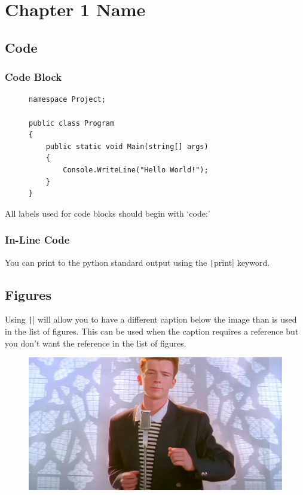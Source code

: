 \chapter{Chapter 1 Name}

\section{Code}

\subsection{Code Block}

\begin{figure}[H]
    \begin{verbatim}
namespace Project;

public class Program
{
    public static void Main(string[] args)
    {
        Console.WriteLine("Hello World!");
    }
}
    \end{verbatim}
\end{figure}

All labels used for code blocks should begin with `code:'

\subsection{In-Line Code}

You can print to the python standard output using the \texttt|print| keyword. 

\newpage
\section{Figures}

Using \texttt|\macLFC| will allow you to have a different caption below the image than is used in the list of figures.
This can be used when the caption requires a reference but you don't want the reference in the list of figures.

\begin{figure}[H]
    \centering
    \includegraphics[width=\textwidth]{assets/example-asset.jpg}
\end{figure}

